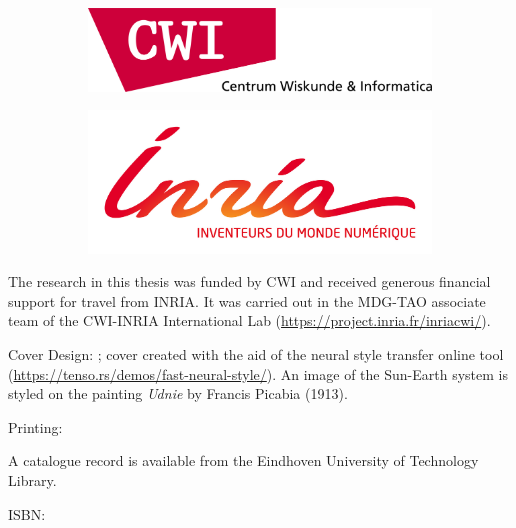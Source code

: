 
\begin{figure}
    \centering
    \begin{subfigure}[b]{0.6\textwidth}
      \centering
      \includegraphics[width=\textwidth]{figures/cwi-logo}
    \end{subfigure}
    \hfill
    \begin{subfigure}[b]{0.6\textwidth}
      \centering
      \includegraphics[width=\textwidth]{figures/inria-logo}
    \end{subfigure}
\end{figure}

\vspace{\fill}

{\noindent
The research in this thesis was funded by CWI and received generous financial support for travel 
from INRIA. It was carried out in the MDG-TAO associate team of the CWI-INRIA International Lab 
(\url{https://project.inria.fr/inriacwi/}).
}

\vspace{\fill}

{
\noindent
Cover Design: \coverdesign; cover created with the aid of the neural style 
transfer online tool (\url{https://tenso.rs/demos/fast-neural-style/}). An 
image of the Sun-Earth system is styled on the painting \textit{Udnie} 
by Francis Picabia (1913).  

\vspace{\baselineskip}

\noindent
Printing: \printingcompany

\vspace{\baselineskip}

\noindent
A catalogue record is available from the Eindhoven University of Technology Library. 

\vspace{\baselineskip}

\noindent
ISBN: \isbncode
}

